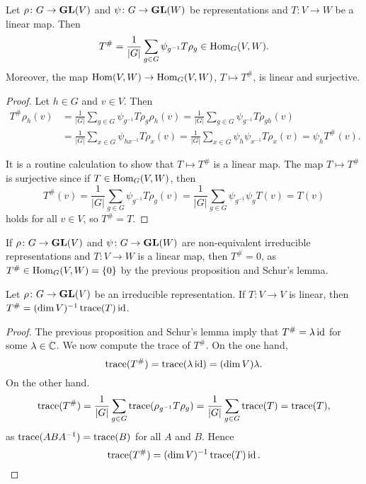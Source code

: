 \begin{proposition}
	Let $\rho\colon G\to\mathbf{GL}(V)$ and $\psi\colon G\to\mathbf{GL}(W)$ be representations
	and $T\colon V\to W$ be a linear map. Then
	\[
	T^{\#}=\frac{1}{|G|}\sum_{g\in G}\psi_{g^{-1}}T\rho_g\in\operatorname{Hom}_G(V,W).
	\]
	Moreover, the map $\operatorname{Hom}(V,W)\to\operatorname{Hom}_G(V,W)$, $T\mapsto T^{\#}$, is linear and surjective.  
\end{proposition}

\begin{proof}
  Let $h\in G$ and $v\in V$. Then 
  \begin{align*}
	T^{\#}\rho_h(v)
	&=\frac{1}{|G|}\sum_{g\in G}\psi_{g^{-1}}T\rho_g\rho_h(v)
	=\frac{1}{|G|}\sum_{g\in G}\psi_{g^{-1}}T\rho_{gh}(v)\\
	&=\frac{1}{|G|}\sum_{x\in G}\psi_{hx^{-1}}T\rho_x(v)
	=\frac{1}{|G|}\sum_{x\in G}\psi_h\psi_{x^{-1}}T\rho_x(v)
	=\psi_hT^{\#}(v).
      \end{align*}

    It is a routine calculation to show that $T\mapsto T^{\#}$ is a linear map. The map
    $T\mapsto T^{\#}$ is surjective since 
    if $T\in\operatorname{Hom}_G(V,W)$, then  
	\[
	T^{\#}(v)=\frac{1}{|G|}\sum_{g\in G}\psi_{g^{-1}}T\rho_g(v)
	=\frac{1}{|G|}\sum_{g\in G}\psi_{g^{-1}}\psi_gT(v)
	=T(v)
      \]
    holds for all $v\in V$, so $T^{\#}=T$.  
\end{proof}

If $\rho\colon G\to\mathbf{GL}(V)$ and $\psi\colon
	G\to\mathbf{GL}(W)$ are non-equivalent irreducible representations and $T\colon
	V\to W$ is a linear map, then $T^{\#}=0$, as 
	$T^{\#}\in\operatorname{Hom}_{G}(V,W)=\{0\}$ by the previous proposition and Schur's lemma.

\begin{theorem}
  Let $\rho\colon G\to\mathbf{GL}(V)$ be an irreducible representation. 
  If $T\colon V\to V$ is linear, then 
  $T^{\#}=(\dim V)^{-1}\operatorname{trace}(T)\operatorname{id}$.
\end{theorem}

\begin{proof}
  The previous proposition and Schur's lemma imply that
  $T^{\#}=\lambda\operatorname{id}$ for some $\lambda\in\mathbb{C}$.
  We now compute the trace of $T^{\#}$. On the one hand, 
  \[
	\operatorname{trace}(T^{\#})=\operatorname{trace}(\lambda\operatorname{id})=(\dim V)\lambda.
  \]
  On the other hand.  
  \[
	\operatorname{trace}(T^{\#})
	=\frac{1}{|G|}\sum_{g\in G}\operatorname{trace}(\rho_{g^{-1}}T\rho_g)
	=\frac{1}{|G|}\sum_{g\in G}\operatorname{trace}(T)
	=\operatorname{trace}(T),
  \]
  as $\operatorname{trace}(ABA^{-1})=\operatorname{trace}(B)$ for all $A$ and $B$. 
  Hence 
  \[
  \operatorname{trace}(T^{\#})=(\dim V)^{-1}\operatorname{trace}(T)\operatorname{id}.\qedhere 
  \]
\end{proof}

